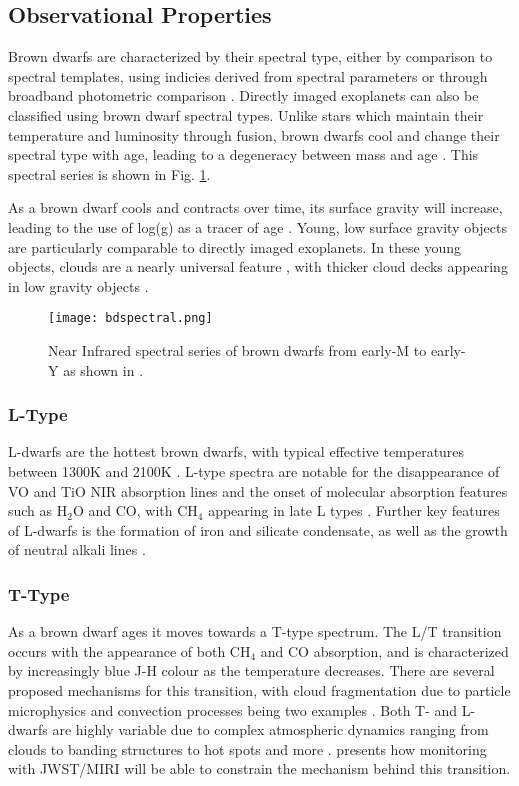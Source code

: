 \subsection{Observational Properties}
Brown dwarfs are characterized by their spectral type, either by comparison to spectral templates, using indicies derived from spectral parameters or through broadband photometric comparison \parencite{Helling2014}.
Directly imaged exoplanets can also be classified using brown dwarf spectral types.
Unlike stars which maintain their temperature and luminosity through fusion, brown dwarfs cool and change their spectral type with age, leading to a degeneracy between mass and age \parencite{Burrows2001}.
This spectral series is shown in Fig. \ref{fig:bdspec}.

As a brown dwarf cools and contracts over time, its surface gravity will increase, leading to the use of log(g) as a tracer of age \parencite{Manjavacas2014}.
Young, low surface gravity objects are particularly comparable to directly imaged exoplanets.
In these young objects, clouds are a nearly universal feature \parencite{Cooper2003,Helling2014}, with thicker cloud decks appearing in low gravity objects \parencite{Helling2014}.

\begin{figure}[t]
	\texttt{[image: bdspectral.png]}
	\caption[Brown Dwarf Spectra]{Near Infrared spectral series of brown dwarfs from early-M to early-Y as shown in \parencite{Helling2014}.}
	\label{fig:bdspec}
\end{figure}

\subsubsection{L-Type}
L-dwarfs are the hottest brown dwarfs, with typical effective temperatures between 1300K and 2100K \parencite{Burrows2001}.
L-type spectra are notable for the disappearance of VO and TiO NIR absorption lines and the onset of molecular absorption features such as H$_{2}$O and CO, with CH$_{4}$ appearing in late L types \parencite{Manjavacas2014}.
Further key features of L-dwarfs is the formation of iron and silicate condensate, as well as the growth of neutral alkali lines \parencite{Burrows2001}.
\subsubsection{T-Type}
As a brown dwarf ages it moves towards a T-type spectrum. 
The L/T transition occurs  with the appearance of both CH$_{4}$ and CO absorption, and is characterized by increasingly blue J-H colour as the temperature decreases.
There are several proposed mechanisms for this transition, with cloud fragmentation due to particle microphysics \parencite{Burningham2017} and convection processes being two examples \parencite{Tremblin2015}.
Both T- and L-dwarfs are highly variable due to complex atmospheric dynamics ranging from clouds to banding structures to hot spots and more \parencite{Biller2017}.
\parencite{Vos2019} presents how monitoring with JWST/MIRI will be able to constrain the mechanism behind this transition.
